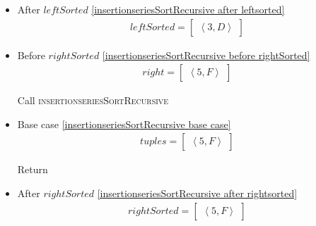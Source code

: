 \begin{frame}[containsverbatim]{\insertionseriesexampleframe}
\begin{columns}[c]
\begin{column}{0.6\textwidth}
{\begin{minipage}[c]{\textwidth}
\begin{multicols}{3}
\begin{itemize}
                                    \item After $leftSorted$ \cref{insertionseriesSortRecursive after leftsorted}
                                    \begin{align*}
                                        leftSorted = \begin{bmatrix}\left<3, D\right>\end{bmatrix}
                                    \end{align*}
            
                                    \item Before $rightSorted$ \cref{insertionseriesSortRecursive before rightSorted}
                                    \begin{align*}
                                        right = \begin{bmatrix}\left<5, F\right>\end{bmatrix}
                                    \end{align*}
        
                                    Call \textsc{insertionseriesSortRecursive}
            
                                    \item Base case \cref{insertionseriesSortRecursive base case}
                                    \begin{align*}
                                        tuples = \begin{bmatrix}\left<5, F\right>\end{bmatrix}
                                    \end{align*}
        
                                    Return
            
                                    \item After $rightSorted$ \cref{insertionseriesSortRecursive after rightsorted}
                                    \begin{align*}
                                        rightSorted = \begin{bmatrix}\left<5, F\right>\end{bmatrix}
                                    \end{align*}
            

\end{itemize}
\end{multicols}
\end{minipage}}
\end{column}
\end{columns}
\end{frame}
